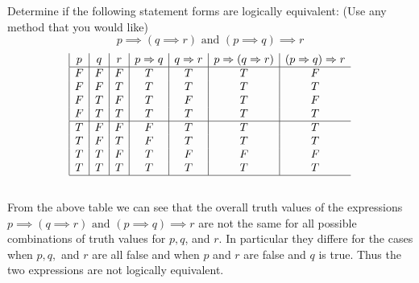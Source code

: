 \documentclass[paper=a4, fontsize=11pt]{jhwhw} %
\begin{document}
\problem{}
Determine if the following statement forms are logically equivalent: (Use any method that you would like)
$$p\implies (q\implies r)\text{ and } (p\implies q)\implies r$$
\solution
\begin{displaymath}
\begin{array}{|c|c|c|c|c|c|c}
   p
 & q
 & r
 & p\Rightarrow{}q
 & q\Rightarrow{}r
 & p\Rightarrow{}(q\Rightarrow{}r)
 & (p\Rightarrow{}q)\Rightarrow{}r \\
\hline
F & F & F & T & T & T & F \\
F & F & T & T & T & T & T \\
F & T & F & T & F & T & F \\
F & T & T & T & T & T & T \\
\hline
T & F & F & F & T & T & T \\
T & F & T & F & T & T & T \\
T & T & F & T & F & F & F \\
T & T & T & T & T & T & T \\
\hline
\end{array}
\end{displaymath}\\
From the above table we can see that the overall truth values of the expressions $p\implies (q\implies r)\text{ and } (p\implies q)\implies r$ are not the same for all possible combinations of truth values for $p,q$, and $r$. In particular they differe for the cases when $p,q,$ and $r$ are all false and when $p$ and $r$ are false and $q$ is true. Thus the two expressions are not logically equivalent.
\end{document}
